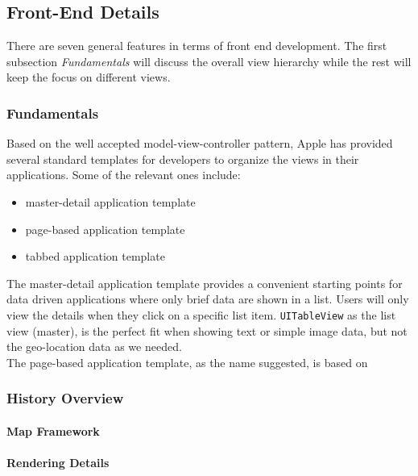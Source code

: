 \documentclass[12pt,a4paper]{article}
\begin{document}
        \subsection{Front-End Details}
        There are seven general features in terms of front end development. The first subsection \textit{Fundamentals} will discuss the overall view hierarchy while the rest will keep the focus on different views.
            
            \subsubsection{Fundamentals} %
            Based on the well accepted model-view-controller pattern, Apple has provided several standard templates for developers to organize the views in their applications. Some of the relevant ones include:
            \begin{itemize}
            \setlength\itemsep{0em}
            \item master-detail application template
            \item page-based application template
            \item tabbed application template
            \end{itemize}
            
            
            The master-detail application template provides a convenient starting points for data driven applications where only brief data are shown in a list. Users will only view the details when they click on a specific list item. \texttt{UITableView} as the list view (master), is the perfect fit when showing text or simple image data, but not the geo-location data as we needed.\\
            
            The page-based application template, as the name suggested, is based on 
            
            \subsubsection{History Overview}
                \paragraph{Map Framework} %
                \paragraph{Rendering Details} %
\end{document}
